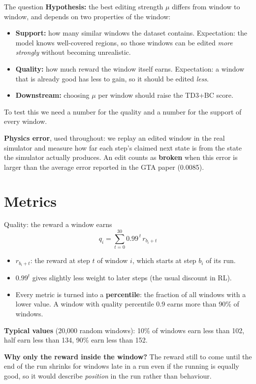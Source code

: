 \documentclass[aspectratio=169,10pt]{beamer}
\begin{document}
\begin{frame}{The question}
\textbf{Hypothesis:} the best editing strength $\mu$ differs from window to window, and depends on two properties of the window:
\vspace{0.4em}
\begin{itemize}
\item \textbf{Support:} how many similar windows the dataset contains. Expectation: the model knows well-covered regions, so those windows can be edited \emph{more strongly} without becoming unrealistic.
\item \textbf{Quality:} how much reward the window itself earns. Expectation: a window that is already good has less to gain, so it should be edited \emph{less}.
\item \textbf{Downstream:} choosing $\mu$ per window should raise the TD3+BC score.
\end{itemize}
\vspace{0.5em}
To test this we need a number for the quality and a number for the support of every window.
\vspace{0.3em}

\textbf{Physics error}, used throughout: we replay an edited window in the real simulator and measure how far each step's claimed next state is from the state the simulator actually produces. An edit counts as \textbf{broken} when this error is larger than the average error reported in the GTA paper (0.0085).
\end{frame}

\section{Metrics}
\begin{frame}{Quality: the reward a window earns}
\[
q_i = \sum_{t=0}^{30} 0.99^{\,t}\, r_{b_i+t}
\]
\begin{itemize}
\item $r_{b_i+t}$: the reward at step $t$ of window $i$, which starts at step $b_i$ of its run.
\item $0.99^{t}$ gives slightly less weight to later steps (the usual discount in RL).
\item Every metric is turned into a \textbf{percentile}: the fraction of all windows with a lower value. A window with quality percentile 0.9 earns more than 90\% of windows.
\end{itemize}
\vspace{0.5em}
\textbf{Typical values} (20{,}000 random windows): 10\% of windows earn less than 102, half earn less than 134, 90\% earn less than 152.
\vspace{0.5em}

\textbf{Why only the reward inside the window?} The reward still to come until the end of the run shrinks for windows late in a run even if the running is equally good, so it would describe \emph{position} in the run rather than behaviour.
\end{frame}
\end{document}
